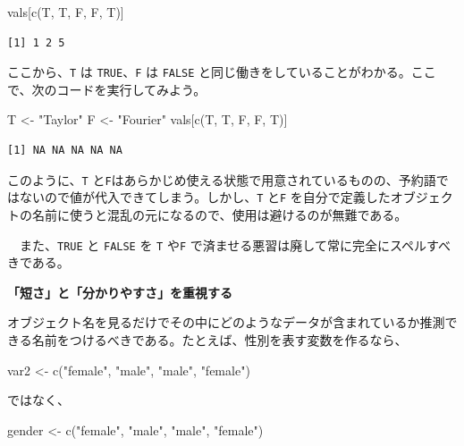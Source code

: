 \documentclass[
  a4paper,
  pandoc,
  ja=standard,
  jafont=haranoaji]{bxjsbook}
\newenvironment{Shaded}{\begin{snugshade}}{\end{snugshade}}
\newcommand{\FunctionTok}[1]{\textcolor[rgb]{0.28,0.35,0.67}{#1}}
\newcommand{\NormalTok}[1]{\textcolor[rgb]{0.00,0.48,0.65}{#1}}
\newcommand{\OtherTok}[1]{\textcolor[rgb]{0.00,0.48,0.65}{#1}}
\newcommand{\StringTok}[1]{\textcolor[rgb]{0.13,0.47,0.30}{#1}}
\begin{document}
\begin{Shaded}
\begin{Highlighting}[numbers=left,,]
\NormalTok{vals[}\FunctionTok{c}\NormalTok{(T, T, F, F, T)]}
\end{Highlighting}
\end{Shaded}

\begin{verbatim}
[1] 1 2 5
\end{verbatim}

ここから、\texttt{T} は \texttt{TRUE}、\texttt{F} は \texttt{FALSE}
と同じ働きをしていることがわかる。ここで、次のコードを実行してみよう。

\begin{Shaded}
\begin{Highlighting}[numbers=left,,]
\NormalTok{T }\OtherTok{\textless{}{-}} \StringTok{"Taylor"}
\NormalTok{F }\OtherTok{\textless{}{-}} \StringTok{"Fourier"}
\NormalTok{vals[}\FunctionTok{c}\NormalTok{(T, T, F, F, T)]}
\end{Highlighting}
\end{Shaded}

\begin{verbatim}
[1] NA NA NA NA NA
\end{verbatim}

このように、\texttt{T}
と\texttt{F}はあらかじめ使える状態で用意されているものの、予約語ではないので値が代入できてしまう。しかし、\texttt{T}
と\texttt{F}
を自分で定義したオブジェクトの名前に使うと混乱の元になるので、使用は避けるのが無難である。

　また、\texttt{TRUE} と \texttt{FALSE} を \texttt{T} や\texttt{F}
で済ませる悪習は廃して常に完全にスペルすべきである。

\textbf{「短さ」と「分かりやすさ」を重視する}

オブジェクト名を見るだけでその中にどのようなデータが含まれているか推測できる名前をつけるべきである。たとえば、性別を表す変数を作るなら、

\begin{Shaded}
\begin{Highlighting}[numbers=left,,]
\NormalTok{var2 }\OtherTok{\textless{}{-}} \FunctionTok{c}\NormalTok{(}\StringTok{"female"}\NormalTok{, }\StringTok{"male"}\NormalTok{, }\StringTok{"male"}\NormalTok{, }\StringTok{"female"}\NormalTok{)}
\end{Highlighting}
\end{Shaded}

ではなく、

\begin{Shaded}
\begin{Highlighting}[numbers=left,,]
\NormalTok{gender }\OtherTok{\textless{}{-}} \FunctionTok{c}\NormalTok{(}\StringTok{"female"}\NormalTok{, }\StringTok{"male"}\NormalTok{, }\StringTok{"male"}\NormalTok{, }\StringTok{"female"}\NormalTok{)}
\end{Highlighting}
\end{Shaded}
\end{document}
